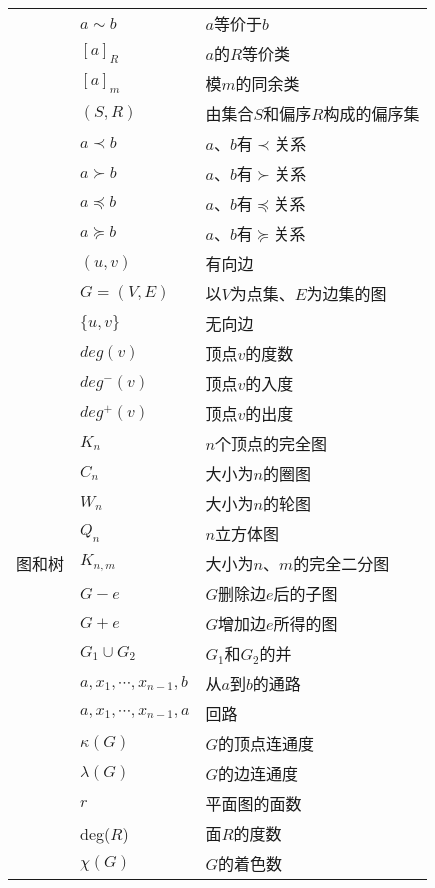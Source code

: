 \documentclass[UTF8]{ctexart}
\begin{document}
\begin{longtable}{|p{9em}|p{15em}|p{15em}|}
  \cline{2-3}
    & $a\sim b$& $a$等价于$b$\\
  \cline{2-3}
    & $[a]_R$& $a$的$R$等价类\\
  \cline{2-3}
    & $[a]_m$& 模$m$的同余类\\
  \cline{2-3}
    & $(S, R)$& 由集合$S$和偏序$R$构成的偏序集\\
  \cline{2-3}
    & $a\prec b$& $a、b$有$\prec$关系\\
  \cline{2-3}
    & $a\succ b$& $a、b$有$\succ$关系\\
  \cline{2-3}
    & $a\preccurlyeq b$& $a、b$有$\preccurlyeq$关系\\
  \cline{2-3}
    & $a\succcurlyeq b$& $a、b$有$\succcurlyeq$关系\\
  \hline
  \multirow{26}{9em}{图和树} & $(u, v)$ & 有向边\\
  \cline{2-3}
    & $G=(V, E)$& 以$V$为点集、$E$为边集的图\\
  \cline{2-3}
    & $\{u, v\}$& 无向边\\
  \cline{2-3}
    & $deg(v)$& 顶点$v$的度数\\
  \cline{2-3}
    & $deg^-(v)$& 顶点$v$的入度\\
  \cline{2-3}
    & $deg^+(v)$& 顶点$v$的出度\\
  \cline{2-3}
    & $K_n$& $n$个顶点的完全图\\
  \cline{2-3}
    & $C_n$& 大小为$n$的圈图\\
  \cline{2-3}
    & $W_n$& 大小为$n$的轮图\\
  \cline{2-3}
    & $Q_n$& $n$立方体图\\
  \cline{2-3}
    & $K_{n,m}$& 大小为$n、m$的完全二分图\\
  \cline{2-3}
    & $G-e$& $G$删除边$e$后的子图\\
  \cline{2-3}
    & $G+e$& $G$增加边$e$所得的图\\
  \cline{2-3}
    & $G_1\cup G_2$& $G_1$和$G_2$的并\\
  \cline{2-3}
    & $a,x_1,\cdots ,x_{n-1},b$& 从$a$到$b$的通路\\
  \cline{2-3}
    & $a,x_1,\cdots ,x_{n-1},a$& 回路\\
  \cline{2-3}
    & $\kappa (G)$& $G$的顶点连通度\\
  \cline{2-3}
    & $\lambda (G)$& $G$的边连通度\\
  \cline{2-3}
    & $r$& 平面图的面数\\
  \cline{2-3}
    & deg($R$)& 面$R$的度数\\
  \cline{2-3}
    & $\chi (G)$& $G$的着色数\\

\end{longtable}
\end{document}
